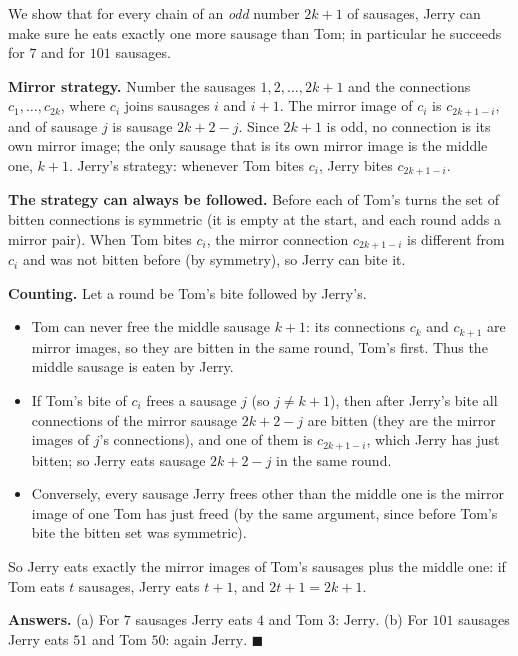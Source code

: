 We show that for every chain of an \emph{odd} number $2k+1$ of sausages, Jerry can make sure he eats exactly one more sausage than Tom; in particular he succeeds for $7$ and for $101$ sausages.

\textbf{Mirror strategy.} Number the sausages $1,2,\dots,2k+1$ and the connections $c_1,\dots,c_{2k}$, where $c_i$ joins sausages $i$ and $i+1$. The mirror image of $c_i$ is $c_{2k+1-i}$, and of sausage $j$ is sausage $2k+2-j$. Since $2k+1$ is odd, no connection is its own mirror image; the only sausage that is its own mirror image is the middle one, $k+1$. Jerry's strategy: whenever Tom bites $c_i$, Jerry bites $c_{2k+1-i}$.

\textbf{The strategy can always be followed.} Before each of Tom's turns the set of bitten connections is symmetric (it is empty at the start, and each round adds a mirror pair). When Tom bites $c_i$, the mirror connection $c_{2k+1-i}$ is different from $c_i$ and was not bitten before (by symmetry), so Jerry can bite it.

\textbf{Counting.} Let a round be Tom's bite followed by Jerry's.
\begin{itemize}
\item Tom can never free the middle sausage $k+1$: its connections $c_k$ and $c_{k+1}$ are mirror images, so they are bitten in the same round, Tom's first. Thus the middle sausage is eaten by Jerry.
\item If Tom's bite of $c_i$ frees a sausage $j$ (so $j\ne k+1$), then after Jerry's bite all connections of the mirror sausage $2k+2-j$ are bitten (they are the mirror images of $j$'s connections), and one of them is $c_{2k+1-i}$, which Jerry has just bitten; so Jerry eats sausage $2k+2-j$ in the same round.
\item Conversely, every sausage Jerry frees other than the middle one is the mirror image of one Tom has just freed (by the same argument, since before Tom's bite the bitten set was symmetric).
\end{itemize}
So Jerry eats exactly the mirror images of Tom's sausages plus the middle one: if Tom eats $t$ sausages, Jerry eats $t+1$, and $2t+1=2k+1$.

\textbf{Answers.} (a) For $7$ sausages Jerry eats $4$ and Tom $3$: $\boxed{\text{Jerry}}$. (b) For $101$ sausages Jerry eats $51$ and Tom $50$: again $\boxed{\text{Jerry}}$. $\blacksquare$
